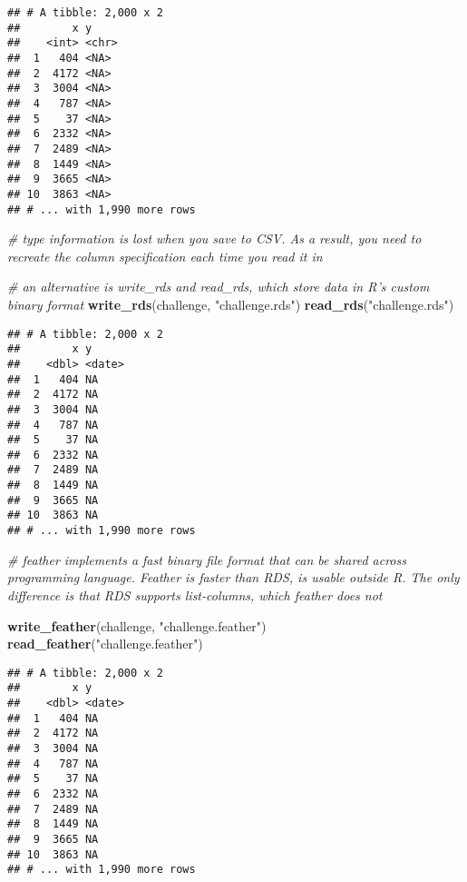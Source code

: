 \documentclass[]{article}
\newenvironment{Shaded}{\begin{snugshade}}{\end{snugshade}}
\newcommand{\KeywordTok}[1]{\textcolor[rgb]{0.13,0.29,0.53}{\textbf{#1}}}
\newcommand{\StringTok}[1]{\textcolor[rgb]{0.31,0.60,0.02}{#1}}
\newcommand{\CommentTok}[1]{\textcolor[rgb]{0.56,0.35,0.01}{\textit{#1}}}
\newcommand{\NormalTok}[1]{#1}
\begin{document}
\begin{verbatim}
## # A tibble: 2,000 x 2
##        x y    
##    <int> <chr>
##  1   404 <NA> 
##  2  4172 <NA> 
##  3  3004 <NA> 
##  4   787 <NA> 
##  5    37 <NA> 
##  6  2332 <NA> 
##  7  2489 <NA> 
##  8  1449 <NA> 
##  9  3665 <NA> 
## 10  3863 <NA> 
## # ... with 1,990 more rows
\end{verbatim}

\begin{Shaded}
\begin{Highlighting}[]
\CommentTok{# type information is lost when you save to CSV. As a result, you need to recreate the column specification each time you read it in}

\CommentTok{# an alternative is write_rds and read_rds, which store data in R's custom binary format}
\KeywordTok{write_rds}\NormalTok{(challenge, }\StringTok{"challenge.rds"}\NormalTok{)}
\KeywordTok{read_rds}\NormalTok{(}\StringTok{"challenge.rds"}\NormalTok{)}
\end{Highlighting}
\end{Shaded}

\begin{verbatim}
## # A tibble: 2,000 x 2
##        x y         
##    <dbl> <date>    
##  1   404 NA        
##  2  4172 NA        
##  3  3004 NA        
##  4   787 NA        
##  5    37 NA        
##  6  2332 NA        
##  7  2489 NA        
##  8  1449 NA        
##  9  3665 NA        
## 10  3863 NA        
## # ... with 1,990 more rows
\end{verbatim}

\begin{Shaded}
\begin{Highlighting}[]
\CommentTok{# feather implements a fast binary file format that can be shared across programming language. Feather is faster than RDS, is usable outside R. The only difference is that RDS supports list-columns, which feather does not }

\KeywordTok{write_feather}\NormalTok{(challenge, }\StringTok{"challenge.feather"}\NormalTok{)}
\KeywordTok{read_feather}\NormalTok{(}\StringTok{"challenge.feather"}\NormalTok{)}
\end{Highlighting}
\end{Shaded}

\begin{verbatim}
## # A tibble: 2,000 x 2
##        x y         
##    <dbl> <date>    
##  1   404 NA        
##  2  4172 NA        
##  3  3004 NA        
##  4   787 NA        
##  5    37 NA        
##  6  2332 NA        
##  7  2489 NA        
##  8  1449 NA        
##  9  3665 NA        
## 10  3863 NA        
## # ... with 1,990 more rows
\end{verbatim}
\end{document}
